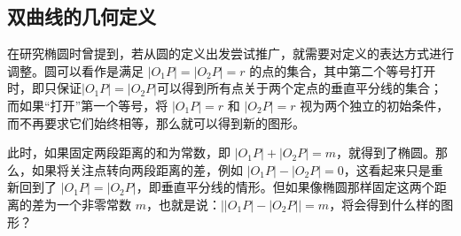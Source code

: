\subsection{双曲线的几何定义}

在研究椭圆时曾提到，若从圆的定义出发尝试推广，就需要对定义的表达方式进行调整。圆可以看作是满足 $|O_1P| = |O_2P| = r$ 的点的集合，其中第二个等号打开时，即只保证$|O_1P| = |O_2P|$可以得到所有点关于两个定点的垂直平分线的集合；而如果“打开”第一个等号，将 $|O_1P| = r$ 和 $|O_2P| = r$ 视为两个独立的初始条件，而不再要求它们始终相等，那么就可以得到新的图形。

此时，如果固定两段距离的和为常数，即 $|O_1P| + |O_2P| = m$，就得到了椭圆。那么，如果将关注点转向两段距离的差，例如 $|O_1P| - |O_2P| = 0$，这看起来只是重新回到了 $|O_1P| = |O_2P|$，即垂直平分线的情形。但如果像椭圆那样固定这两个距离的差为一个非零常数 $m$，也就是说：$\left||O_1P| - |O_2P|\right| = m$，将会得到什么样的图形？

